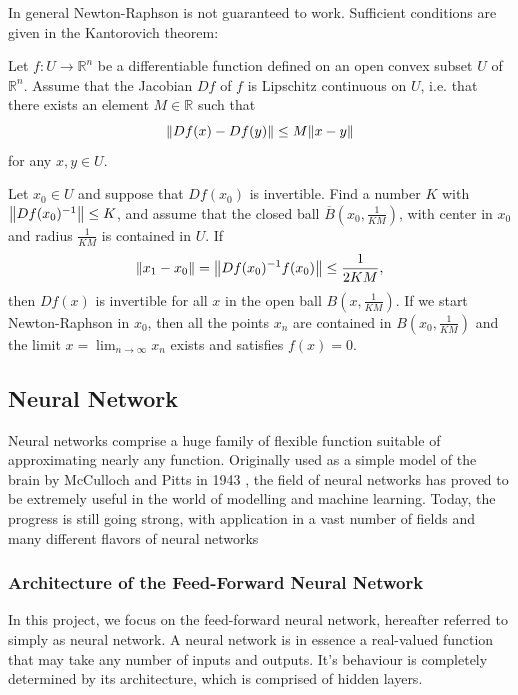 In general Newton-Raphson is not guaranteed to work. Sufficient conditions are given in the Kantorovich theorem:
\begin{theorem}
  Let $f\colon U\to\mathbb{R}^n$ be a differentiable function defined on an open convex subset $U$ of $\mathbb{R}^n$. Assume that the Jacobian $Df$ of $f$ is Lipschitz continuous on $U$, i.e. that there exists an element $M\in\mathbb{R}$ such that
  \begin{equation*}
    \norm{Df(x)-Df(y)}\le M\norm{x-y}
  \end{equation*}
  for any $x,y\in U$.

Let $x_0\in U$ and suppose that $Df(x_0)$ is invertible. Find a number $K$ with $\norm{Df(x_0)^{-1}}\le K$, and assume that the closed ball $\overline{B}\left(x_0,\frac{1}{KM}\right)$, with center in $x_0$ and radius $\frac{1}{KM}$ is contained in $U$. If
\begin{equation*}
  \norm{x_1-x_0}=\norm{Df(x_0)^{-1}f(x_0)}\le\frac{1}{2KM},
\end{equation*}
then $Df(x)$ is invertible for all $x$ in the open ball $B\left(x,\frac{1}{KM}\right)$. If we start Newton-Raphson in $x_0$, then all the points $x_n$ are contained in $B\left(x_0,\frac{1}{KM}\right)$ and the limit $x=\lim_{n\to\infty}x_n$ exists and satisfies $f(x)=0$.
\end{theorem}

\subsection{Neural Network}\label{sec:dnn theory}
Neural networks comprise a huge family of flexible function suitable of approximating nearly any function. Originally used as a simple model of the brain 
by McCulloch and Pitts in 1943 \cite{nnMorten}, the field of neural networks has proved to be extremely useful in the world of modelling and machine learning. Today, the progress is still going strong, with application in a vast number of fields and many different flavors of neural networks

\subsubsection{Architecture of the Feed-Forward Neural Network}
In this project, we focus on the feed-forward neural network, hereafter referred
to simply as neural network. A neural network is in essence a real-valued function that may take any number of inputs and outputs. It's behaviour is completely determined by its architecture, which is comprised of hidden layers.

